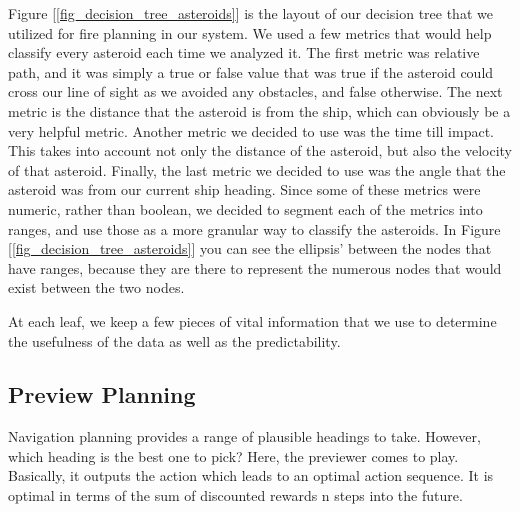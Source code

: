 \documentclass[10pt,final,conference]{article}
\begin{document}
Figure [\ref{fig_decision_tree_asteroids}] is the layout of our decision tree that we utilized for fire planning in our system.  We used a few metrics that would help classify every asteroid each time we analyzed it.  The first metric was relative path, and it was simply a true or false value that was true if the asteroid could cross our line of sight as we avoided any obstacles, and false otherwise.  The next metric is the distance that the asteroid is from the ship, which can obviously be a very helpful metric.  Another metric we decided to use was the time till impact.  This takes into account not only the distance of the asteroid, but also the velocity of that asteroid.  Finally, the last metric we decided to use was the angle that the asteroid was from our current ship heading.  Since some of these metrics were numeric, rather than boolean, we decided to segment each of the metrics into ranges, and use those as a more granular way to classify the asteroids.  In Figure [\ref{fig_decision_tree_asteroids}] you can see the ellipsis' between the nodes that have ranges, because they are there to represent the numerous nodes that would exist between the two nodes.

At each leaf, we keep a few pieces of vital information that we use to determine the usefulness of the data as well as the predictability.  

\subsection{Preview Planning}
Navigation planning provides a range of plausible headings to take. However, which heading is the best one to pick? Here, the previewer comes to play. Basically, it outputs the action which leads to an optimal action sequence. It is optimal in terms of the sum of discounted rewards n steps into the future.
\end{document}
